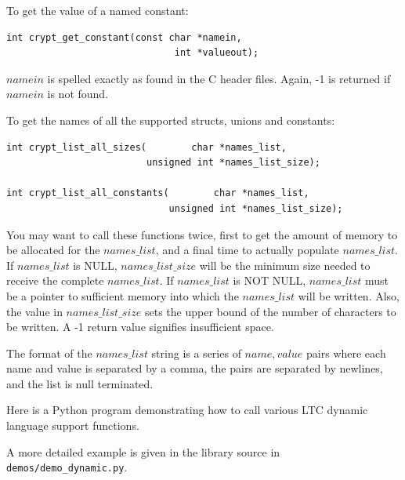 \documentclass[synpaper]{book}
\begin{document}
To get the value of a named constant:
\begin{verbatim}
int crypt_get_constant(const char *namein,
                              int *valueout);
\end{verbatim}
$namein$ is spelled exactly as found in the C header files.  Again, -1 is
returned if $namein$ is not found.

To get the names of all the supported structs, unions and constants:
\begin{verbatim}
int crypt_list_all_sizes(        char *names_list,
                         unsigned int *names_list_size);

int crypt_list_all_constants(        char *names_list,
                             unsigned int *names_list_size);
\end{verbatim}
You may want to call these functions twice, first to get the amount
of memory to be allocated for the $names\_list$, and a final time to
actually populate $names\_list$.  If $names\_list$ is NULL,
$names\_list\_size$ will be the minimum size needed to receive the
complete $names\_list$.  If $names\_list$ is NOT NULL, $names\_list$ must
be a pointer to sufficient memory into which the $names\_list$ will be
written.  Also, the value in $names\_list\_size$ sets the upper bound of
the number of characters to be written.  A -1 return value signifies
insufficient space.

The format of the $names\_list$ string is a series of $name,value$ pairs
where each name and value is separated by a comma, the pairs are separated
by newlines, and the list is null terminated.

Here is a Python program demonstrating how to call various LTC dynamic
language support functions.

A more detailed example is given in the library source in \texttt{demos/demo\_dynamic.py}.
\end{document}
